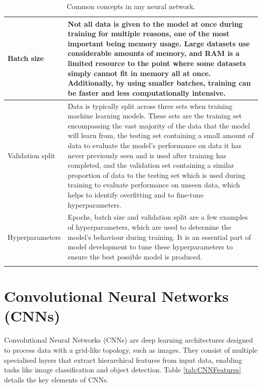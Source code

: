 \documentclass[12pt]{report}
\begin{document}
\begin{longtable}{ | p{} | p{} | }
    Batch size & Not all data is given to the model at once during training for multiple reasons,
    one of the most important being memory usage. Large datasets use considerable amounts of memory,
    and RAM is a limited resource to the point where some datasets simply cannot fit in memory all 
    at once. Additionally, by using smaller batches, training can be faster and less computationally 
    intensive. \\
    \hline 
    Validation split & Data is typically split across three sets when training machine learning models.
    These sets are the training set encompassing the vast majority of the data that the model will 
    learn from, the testing set containing a small amount of data to evaluate the model's performance 
    on data it has never previously seen and is used after training has completed, 
    and the validation set containing a similar proportion of data 
    to the testing set which is used during training to evaluate performance on unseen data, which helps 
    to identify overfitting and to fine-tune hyperparameters.\\
    \hline 
    Hyperparameters & Epochs, batch size and validation split are a few examples of hyperparameters,
    which are used to determine the model's behaviour during training. It is an essential part of 
    model development to tune these hyperparameters to ensure the best possible model is produced. \\
    \hline
    \caption{Common concepts in any neural network.}\label{tab:NeuralNetworkComponents}
\end{longtable}


\section{Convolutional Neural Networks (CNNs)}
Convolutional Neural Networks (CNNs) are deep learning architectures designed to process data with a grid-like topology, such as images.
They consist of multiple specialised layers that extract hierarchical features from input data, enabling tasks like image classification and 
object detection. Table \ref{tab:CNNFeatures} details the key elements of CNNs.
\end{document}
